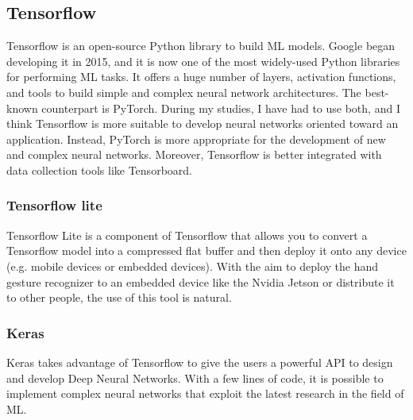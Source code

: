 \documentclass[../thesis.tex]{subfiles}
\begin{document}
\subsection{Tensorflow}
Tensorflow is an open-source Python library to build \acrshort{ML} models. Google began developing it in 2015, and it is now one of the most widely-used Python libraries for performing \acrshort{ML} tasks. It offers a huge number of layers, activation functions, and tools to build simple and complex neural network architectures. The best-known counterpart is PyTorch. During my studies, I have had to use both, and I think Tensorflow is more suitable to develop neural networks oriented toward an application. Instead, PyTorch is more appropriate for the development of new and complex neural networks. Moreover, Tensorflow is better integrated with data collection tools like Tensorboard. 

\subsubsection{Tensorflow lite}
Tensorflow Lite is a component of Tensorflow that allows you to convert a Tensorflow model into a compressed flat buffer and then deploy it onto any device (e.g. mobile devices or embedded devices). With the aim to deploy the hand gesture recognizer to an embedded device like the Nvidia Jetson or distribute it to other people, the use of this tool is natural.

\subsubsection{Keras}
Keras takes advantage of Tensorflow to give the users a powerful API to design and develop Deep Neural Networks. With a few lines of code, it is possible to implement complex neural networks that exploit the latest research in the field of  \gls{ML}.
\end{document}
